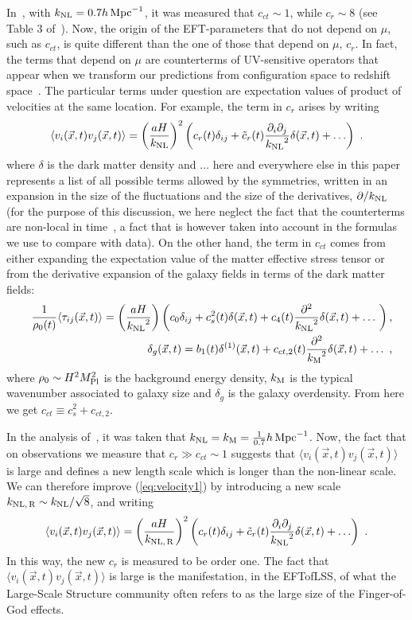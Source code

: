 \documentclass[12pt,a4paper]{article}
\def\hinvMpc{h\,{\rm Mpc}^{-1}}
\newcommand{\dd}{\partial}
\renewcommand{\(}{\left(}
\renewcommand{\)}{\right)}
\newcommand{\mpl}{M_{\rm Pl}}
\def\be{\begin{equation}}
\def\ee{\end{equation}}
\def\ba{\begin{eqnarray}}
\def\ea{\end{eqnarray}}
\def\knl{{k_{\rm NL}}}
\def\km{{k_{\rm M}}}
\def\knlr{{k_{\rm NL,\,R}}}
\begin{document}
In~\cite{DAmico:2019fhj,Colas:2019ret}, with $\knl=0.7\hinvMpc$, it was measured that $c_{ct}\sim 1$,  while $c_r\sim 8$ (see Table 3 of~\cite{DAmico:2019fhj}). Now, the origin of the EFT-parameters that do not depend on $\mu$, such as $c_{ct}$, is quite different than {the one of} those that depend on $\mu$, $c_r$. In fact, the terms that depend on $\mu$ are counterterms of UV-sensitive operators that appear when we {transform} our predictions from configuration space to redshift space~\cite{Senatore:2014vja}. The particular terms under question are expectation values of product of velocities at the same location. For example, the term in $c_r$ arises by writing~\cite{Senatore:2014vja} 
\be\label{eq:velocity1}
\langle v_i(\vec x,t) v_j(\vec x,t)\rangle=\left(\frac{aH}{\knl}\right)^2\left(c_r(t) \delta_{ij}+ \tilde c_r(t) \frac{\dd_i\dd_j}{\knl^2}\delta(\vec x,t)+\ldots\right) \ .
\ee
where $\delta$ is the dark matter density and $\ldots$ here and everywhere else in this paper represents a list of all possible terms allowed by the symmetries, written in an expansion in the size of the fluctuations and the size of the derivatives, $\dd/\knl$ (for the purpose of this discussion, we here neglect the fact that the counterterms are non-local in time~\cite{Senatore:2014eva}, a fact that is however taken into account in the formulas we use to compare with data).
On the other hand, the term in $c_{ct}$ comes from either expanding the expectation value of the matter effective stress tensor or from the derivative expansion of the galaxy fields in terms of the dark matter fields:
\ba\label{eq:stess_tensor1}
&&\frac{1}{\rho_0(t)}\langle\tau_{ij}(\vec x,t)\rangle=\left(\frac{a H}{\knl^2}\right)\left(c_0 \delta_{ij}+c_{s}^2(t)  \delta(\vec x,t)+c_{4}(t) \frac{\dd^2}{\knl^2} \delta(\vec x,t)+\ldots\ \right),\\ 
\label{eq:galaxy_derivative1}
&&\delta_g(\vec x,t)=b_1(t) \delta^{(1)}(\vec x,t)+ c_{ct,2}(t) \frac{\dd^2}{\km^2}\delta(\vec x,t)+\dots \ ,
\ea
where $\rho_0\sim H^2\mpl^2$ is the background energy density, $\km$ is the {typical wavenumber associated to galaxy size} and $\delta_g$ is the galaxy overdensity. From here we get $c_{ct}\equiv c_s^2+c_{ct,2}$. 

In the analysis of~\cite{DAmico:2019fhj,Colas:2019ret}, it was taken that $\knl=\km=\frac{1}{0.7}\hinvMpc$. Now, the fact that on observations we measure that $c_{r}\gg c_{ct}\sim 1$ suggests that $\langle v_i(\vec x,t) v_j(\vec x,t)\rangle$ is large and defines a new {length} scale which is longer than the non-linear scale. We can therefore improve (\ref{eq:velocity1}) by introducing a new scale {$\knlr\sim \knl/\sqrt{8}$}, and writing
 \be\label{eq:velocity2}
\langle v_i(\vec x,t) v_j(\vec x,t)\rangle=\left(\frac{aH}{\knlr}\right)^2\left(c_r(t) \delta_{ij}+ \tilde c_r(t) \frac{\dd_i\dd_j}{\knl^2}\delta(\vec x,t)+\ldots\right) \ .
\ee
In this way, the new $c_r$ is measured to be order one. The fact that $\langle v_i(\vec x,t) v_j(\vec x,t)\rangle$ is large is the manifestation, in the EFTofLSS, of what the Large-Scale Structure community often refers to as the {large size} of the Finger-of-God effects. 
\end{document}
